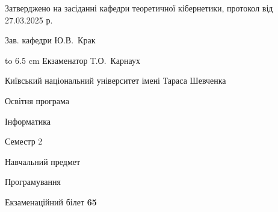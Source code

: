 \documentclass[12pt, ukrainian]{article}
\begin{document}
{\smallskip\smallskip \begin {scriptsize} Затверджено на засіданні кафедри теоретичної кібернетики, протокол   від   27.03.2025 р.\par\smallskip\smallskip\smallskip\smallskip
{\parbox {6.5 cm} {Зав. кафедри \dotfill Ю.В.~Крак}}\hspace {0.7cm} {\hbox to 6.5 cm { Екзаменатор \dotfill Т.О.~Карнаух}} \end{scriptsize}}
\newpage
{{\begin {scriptsize}\par
{ \center  Київський національний університет імені Тараса Шевченка \par}
{\parbox {5 cm}{Освітня програма \hfill}{\parbox {7 cm}{Інформатика\hfill}}\parbox {6 cm}{\hfill Семестр 2}}\par
{\parbox {5 cm} {Навчальний предмет \hfill}\parbox {7 cm}{Програмування \hfill}\parbox {6cm}{\hfill}\par}\vspace{-15pt} \end{scriptsize}}{\center Екзаменаційний білет \No \textbf { 65 }\par}}
\end{document}
